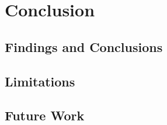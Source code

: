\chapter{Conclusion}
\label{cha:conclusion}

\section{Findings and Conclusions}
\label{cha:conclusion:sec:findings}

\section{Limitations}
\label{cha:conclusion:sec:limitations}

\section{Future Work}
\label{cha:conclusion:sec:future}
